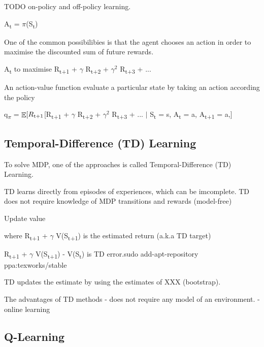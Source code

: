 \documentclass[12pt,twoside]{report}
\DeclareMathOperator{\E}{\mathbb{E}}
\begin{document}
TODO on-policy and off-policy learning.

A\textsubscript{t} = $\pi$(S\textsubscript{t})

One of the common possibilibies is that the agent chooses an action in order to maximise the discounted sum of future rewards.

A\textsubscript{t} to maximise R\textsubscript{t+1} + $\gamma$ R\textsubscript{t+2} + $\gamma^2$ R\textsubscript{t+3} + ...


An action-value function evaluate a particular state by taking an action according the policy

q\textsubscript{$\pi$} = $\displaystyle \E[R\textsubscript{t+1} $[R\textsubscript{t+1} + $\gamma$ R\textsubscript{t+2} + $\gamma^2$ R\textsubscript{t+3} + ... $\vert$ S\textsubscript{t} = s, A\textsubscript{t} = a, A\textsubscript{t+1 } = a,]




\subsection{Temporal-Difference (TD) Learning}

To solve MDP, one of the approaches is called Temporal-Difference (TD) Learning.

TD learns directly from episodes of experiences, which can be imcomplete.
TD does not require knowledge of MDP transitions and rewards (model-free)

Update value


where R\textsubscript{t+1} + $\gamma$ V(S\textsubscript{t+1}) is the estimated return (a.k.a TD target)

R\textsubscript{t+1} + $\gamma$ V(S\textsubscript{t+1}) - V(S\textsubscript{t}) is TD error.sudo add-apt-repository ppa:texworks/stable

TD updates the estimate by using the estimates of XXX (bootstrap).

The advantages of TD methods
- does not require any model of an environment.
- online learning

\subsection{Q-Learning}
\end{document}
